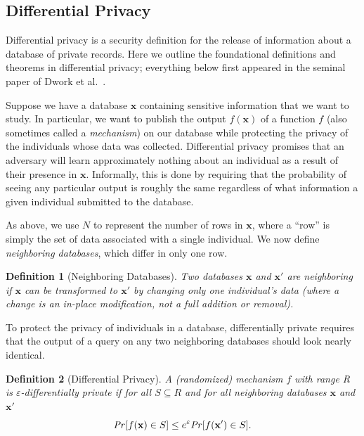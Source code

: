 \documentclass[USenglish,oneside]{article}
\newcounter{ab}
\newcounter{ar}
\newcounter{igh}
\newcounter{ms}
\newtheorem{definition}{Definition}
\newcommand{\dbsize}{\ensuremath{N}\xspace}
\newcommand{\eps}{\ensuremath{\varepsilon}\xspace}
\newcommand{\x}{\ensuremath{\mathbf{x}}\xspace}
\begin{document}
\subsection{Differential Privacy}
Differential privacy is a security definition for the release of information about a database of private records. Here we outline the foundational definitions and theorems in differential privacy; everything below first appeared in the seminal paper of Dwork et al.~\cite{dwork2006calibrating}.

Suppose we have a database \x containing sensitive information that we want to study. In particular, we want to publish the output $f(\x)$ of a function $f$ (also sometimes called a \textit{mechanism}) on our database while protecting the privacy of the individuals whose data was collected. Differential privacy promises that an adversary will learn approximately nothing about an individual as a result of their presence in \x.  Informally, this is done by requiring that the probability of seeing any particular output is roughly the same regardless of what information a given individual submitted to the database.

As above, we use \dbsize to represent the number of rows in \x, where a ``row'' is simply the set of data associated with a single individual.  We now define \textit{neighboring databases}, which differ in only one row.

\begin{definition}[Neighboring Databases]\label{def:Neighboring} Two databases \x and $\x'$ are \textit{neighboring} if \x can be transformed to $\x'$ by changing only one individual's data (where a change is an in-place modification, not a full addition or removal).
\end{definition}

To protect the privacy of individuals in a database, differentially private requires that the output of a query on any two neighboring databases should look nearly identical.

\begin{definition}[Differential Privacy] \label{def:diffpriv}
A (randomized) mechanism $f$ with range R is \emph{$\eps$-differentially private} if for all $S \subseteq R$ and for all neighboring databases \x and $\x'$
\begin{equation*}
\text{\emph{Pr}}[f(\x) \in S] \leq e^{\eps} \text{\emph{Pr}}[f(\x') \in S]. 
\end{equation*}
\end{definition}
\end{document}
